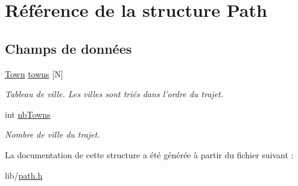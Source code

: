 \hypertarget{structPath}{
\section{Référence de la structure Path}
\label{structPath}
}
\subsection*{Champs de données}
\begin{DoxyCompactItemize}
\item 
\hypertarget{structPath_aa6e2db030cf042e7ae3fe053fa6f0195}{
\hyperlink{structTown}{Town} \hyperlink{structPath_aa6e2db030cf042e7ae3fe053fa6f0195}{towns} \mbox{[}N\mbox{]}}
\label{structPath_aa6e2db030cf042e7ae3fe053fa6f0195}

\begin{DoxyCompactList}\small\item\em Tableau de ville. Les villes sont triés dans l'ordre du trajet. \item\end{DoxyCompactList}\item 
\hypertarget{structPath_a3caeb081a51e3fb89e638aa4bccd2110}{
int \hyperlink{structPath_a3caeb081a51e3fb89e638aa4bccd2110}{nbTowns}}
\label{structPath_a3caeb081a51e3fb89e638aa4bccd2110}

\begin{DoxyCompactList}\small\item\em Nombre de ville du trajet. \item\end{DoxyCompactList}\end{DoxyCompactItemize}


La documentation de cette structure a été générée à partir du fichier suivant :\begin{DoxyCompactItemize}
\item 
lib/\hyperlink{path_8h}{path.h}\end{DoxyCompactItemize}
